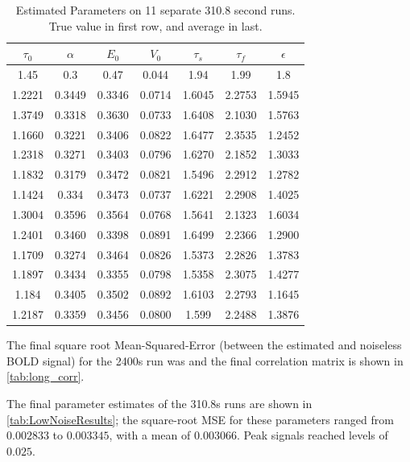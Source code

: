 \documentclass[journal]{./IEEEtran}
\begin{document}
\begin{table}[!t]
\renewcommand{\arraystretch}{1.3}
\centering
\begin{tabular}{|c | c | c | c | c | c | c | }
\hline
$\tau_0$ & $\alpha$ & $E_0$    & $V_0$    & $\tau_s$ & $\tau_f$ & $\epsilon$ \\
\hline
\rowcolor[gray]{.8}
1.45 & 0.3 & 0.47 & 0.044 & 1.94 & 1.99 & 1.8  \\
\hline
\hline
1.2221 & 0.3449 & 0.3346 & 0.0714 & 1.6045 & 2.2753 & 1.5945 \\
1.3749 & 0.3318 & 0.3630 & 0.0733 & 1.6408 & 2.1030 & 1.5763 \\
1.1660 & 0.3221 & 0.3406 & 0.0822 & 1.6477 & 2.3535 & 1.2452 \\
1.2318 & 0.3271 & 0.3403 & 0.0796 & 1.6270 & 2.1852 & 1.3033 \\
1.1832 & 0.3179 & 0.3472 & 0.0821 & 1.5496 & 2.2912 & 1.2782 \\
1.1424 & 0.334  & 0.3473 & 0.0737 & 1.6221 & 2.2908 & 1.4025 \\
1.3004 & 0.3596 & 0.3564 & 0.0768 & 1.5641 & 2.1323 & 1.6034 \\
1.2401 & 0.3460 & 0.3398 & 0.0891 & 1.6499 & 2.2366 & 1.2900 \\
1.1709 & 0.3274 & 0.3464 & 0.0826 & 1.5373 & 2.2826 & 1.3783 \\
1.1897 & 0.3434 & 0.3355 & 0.0798 & 1.5358 & 2.3075 & 1.4277 \\
1.184 &  0.3405 & 0.3502 & 0.0892 & 1.6103 & 2.2793 & 1.1645 \\
\hline
1.2187 & 0.3359 & 0.3456 & 0.0800 & 1.599 & 2.2488 & 1.3876 \\
\hline
\end{tabular}
\caption{Estimated Parameters on 11 separate 310.8 second runs. 
    True value in first row,
    and average in last.}
\label{tab:LowNoiseResults}
\end{table}

The final square root Mean-Squared-Error (between the estimated and 
noiseless BOLD signal) for the 2400s run was %
and the final correlation matrix is shown in \autoref{tab:long_corr}.

The final parameter estimates of the 310.8s runs are shown in
\autoref{tab:LowNoiseResults}; the square-root MSE for these
parameters ranged from $0.002833$ to $0.003345$, with a mean of 
$0.003066$. Peak signals reached levels of $0.025$.
\end{document}
